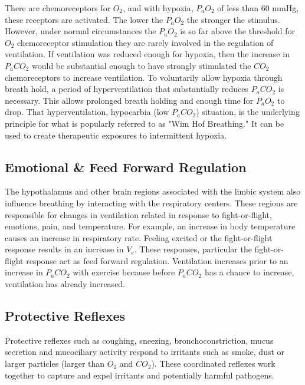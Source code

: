 There are chemoreceptors for $O_2$, and with hypoxia, $P_aO_2$ of less than 60 mmHg, these receptors are activated. The lower the $P_aO_2$ the stronger the stimulus. However, under normal circumstances the $P_aO_2$ is so far above the threshold for $O_2$ chemoreceptor stimulation they are rarely involved in the regulation of ventilation. If ventilation was reduced enough for hypoxia, then the increase in $P_aCO_2$ would be substantial enough to have strongly stimulated the $CO_2$ chemoreceptors to increase ventilation. To voluntarily allow hypoxia through breath hold, a period of hyperventilation that substantially reduces $P_aCO_2$ is necessary. This allows prolonged breath holding and enough time for $P_aO_2$ to drop. That hyperventilation, hypocarbia (low $P_aCO_2$) situation, is the underlying principle for what is popularly referred to as "Wim Hof Breathing." It can be used to create therapeutic exposures to intermittent hypoxia.

\subsection{Emotional \& Feed Forward Regulation}
The hypothalamus and other brain regions associated with the limbic system also influence breathing by interacting with the respiratory centers. These regions are responsible for changes in ventilation related in response to fight-or-flight, emotions, pain, and temperature. For example, an increase in body temperature causes an increase in respiratory rate. Feeling excited or the fight-or-flight response results in an increase in $V_e$. These responses, particular the fight-or-flight response act as feed forward regulation. Ventilation increases prior to an increase in $P_aCO_2$ with exercise because before $P_aCO_2$ has a chance to increase, ventilation has already increased.

\subsection{Protective Reflexes}

Protective reflexes such as coughing, sneezing, bronchoconstriction, mucus secretion and mucociliary activity respond to irritants such as smoke, dust or larger particles (larger than $O_2$ and $CO_2$). These coordinated reflexes work together to capture and expel irritants and potentially harmful pathogens.


